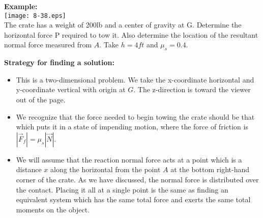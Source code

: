 \documentclass{seminar}
\begin{document}
\begin{slide}

{\bf\blue Example:} \\
\texttt{[image: 8-38.eps]}\\
The crate has a weight of 200lb and a center of
gravity at G. Determine the horizontal force P required to tow it.
Also determine the location of the resultant normal force  measured
from $A$. Take $h=4ft$ and $\mu_s=0.4$.
\vfill
\end{slide}
































\begin{slide}
{\bf\blue Strategy for finding a solution:} 
\begin{itemize} 
\item{}This is a two-dimensional problem.  We take the x-coordinate horizontal and
y-coordinate vertical with origin at $G$. The z-direction is 
toward the viewer out of the page.
\item{}We recognize that the force needed to begin towing the crate should be that 
which puts it in a state of impending motion, where the force of friction is
$|\vec F_f|=\mu_s|\vec N|$.
\item{}We will assume that the reaction normal force acts at a point which is
a distance $x$ along the horizontal from the point $A$ at the bottom right-hand corner
of the crate.  As we have discussed, the normal force is distributed over the contact.  Placing
it all at a single point is the same as finding an equivalent system which has the same total
force and exerts the same total moments on the object. 
\end{itemize}
\vfill
\end{slide}
\end{document}
